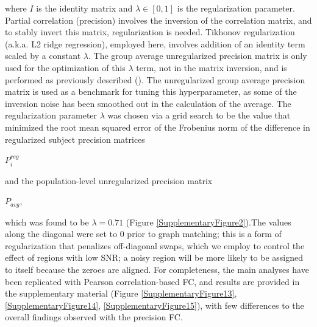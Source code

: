 \documentclass[phd,tocprelim]{cornell}
\begin{document}
    where $I$ is the identity matrix and $\lambda \in [0,1]$ is the regularization parameter.  Partial correlation (precision) involves the inversion of the correlation matrix, and to stably invert this matrix, regularization is needed. Tikhonov regularization (a.k.a. L2 ridge regression), employed here, involves addition of an identity term scaled by a constant $\lambda$. The group average unregularized precision matrix is only used for the optimization of this $\lambda$ term, not in the matrix inversion, and is performed as previously described (\cite{Liegeois2020-ua, Golub1999-ou}). The unregularized group average precision matrix is used as a benchmark for tuning this hyperparameter, as some of the inversion noise has been smoothed out in the calculation of the average. The regularization parameter $\lambda$ was chosen via a grid search to be the value that minimized the root mean squared error of the Frobenius norm of the difference in regularized subject precision matrices \begin{Large}$P_i^{reg}$\end{Large} and the population-level unregularized precision matrix \begin{Large}$P_{avg}$,\end{Large} which was found to be $\lambda = 0.71$ (Figure \ref{SupplementaryFigure2}).The values along the diagonal were set to 0 prior to graph matching; this is a form of regularization that penalizes off-diagonal swaps, which we employ to control the effect of regions with low SNR; a noisy region will be more likely to be assigned to itself because the zeroes are aligned. For completeness, the main analyses have been replicated with Pearson correlation-based FC, and results are provided in the supplementary material (Figure \ref{SupplementaryFigure13}, \ref{SupplementaryFigure14}, \ref{SupplementaryFigure15}), with few differences to the overall findings observed with the precision FC.
    
\end{document}

